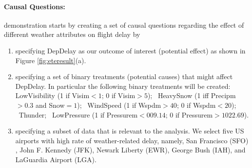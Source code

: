   \paragraph{\bf Causal Questions:} 
demonstration starts by creating a set of causal questions regarding the effect of different weather attributes on flight delay by
    \begin{enumerate}
      \item specifying DepDelay as our outcome of interest (potential effect) as shown in Figure \ref{fig:eteresult}(a).
      \item specifying a set of binary treatments (potential causes) that might affect DepDelay. In particular the following binary treatments will be created: LowVisibility (1 if Visim$<1$; 0 if Visim$>5$); \ HeavySnow (1 iff Precipm$>0.3$ and Snow$=1$); \ WindSpeed (1 if Wspdm$>40$; 0 if Wspdm$<20$); \  Thunder; \ LowPressure (1 if Pressurem$<009.14$; 0 if Pressurem$>1022.69$).
      
      \item specifying a subset of data that is relevant to the analysis.  We select five US airports  with high rate of weather-related delay, namely, San Francisco (SFO) , John F. Kennedy (JFK), Newark Liberty (EWR), George Bush (IAH), and LaGuardia Airport (LGA).
\end{enumerate}


